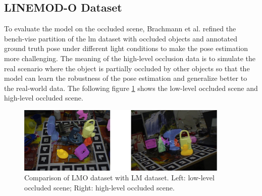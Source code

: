 \documentclass[12pt,DIV14,BCOR12mm,a4paper,footinclude=false,headinclude,parskip=half-,twoside,openright,cleardoublepage=empty,toc=index,bibliography=totoc,listof=totoc]{scrreprt}
\numberwithin{equation}{chapter}
\begin{document}
\subsection{LINEMOD-O Dataset}
To evaluate the model on the occluded scene, Brachmann et al. \cite{dataV4MUMX2020} refined the bench-vise partition of the \gls{lm} dataset with occluded objects and annotated ground truth pose under different light conditions to make the pose estimation more challenging. The meaning of the high-level occlusion data is to simulate the real scenario where the object is partially occluded by other objects so that the model can learn the robustness of the pose estimation and generalize better to the real-world data. The following figure \ref{img:linemod_o} shows the low-level occluded scene and high-level occluded scene.
\begin{figure}[h]
  \centering
  \includegraphics[width=0.9\textwidth]{img/lmo.pdf}
  \caption{Comparison of LMO dataset with LM dataset. Left: low-level occluded scene; Right: high-level occluded scene.}
  \label{img:linemod_o}
\end{figure}
\end{document}
